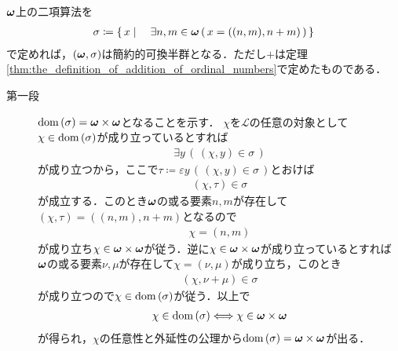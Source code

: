 	\begin{screen}
		\begin{thm}
			${\boldsymbol \omega}$上の二項算法を
			\begin{align}
				\sigma \coloneqq \left\{\, x \mid \quad \exists n,m \in {\boldsymbol \omega}\, (\, x=((n,m),n+m)\, )\, \right\}
			\end{align}
			で定めれば，$({\boldsymbol \omega},\sigma)$は簡約的可換半群となる．ただし$+$は定理
			\ref{thm:the_definition_of_addition_of_ordinal_numbers}で定めたものである．
		\end{thm}
	\end{screen}
	
	\begin{prf}\mbox{}
		\begin{description}
			\item[第一段]
				$\operatorname*{dom} \left(\sigma\right) = {\boldsymbol \omega} \times {\boldsymbol \omega}$となることを示す．
				$\chi$を$\mathcal{L}$の任意の対象として$\chi \in \operatorname*{dom} \left(\sigma\right)$が成り立っているとすれば
				\begin{align}
					\exists y\, (\, (\chi,y) \in \sigma\, )
				\end{align}
				が成り立つから，ここで$\tau \coloneqq \varepsilon y\, (\, (\chi,y) \in \sigma\, )$とおけば
				\begin{align}
					(\chi,\tau) \in \sigma
				\end{align}
				が成立する．このとき${\boldsymbol \omega}$の或る要素$n,m$が存在して$(\chi,\tau) = ((n,m),n+m)$となるので
				\begin{align}
					\chi = (n,m)
				\end{align}
				が成り立ち$\chi \in {\boldsymbol \omega} \times {\boldsymbol \omega}$が従う．逆に$\chi \in {\boldsymbol \omega} \times {\boldsymbol \omega}$が成り立っているとすれば
				${\boldsymbol \omega}$の或る要素$\nu,\mu$が存在して$\chi = (\nu,\mu)$が成り立ち，このとき
				\begin{align}
					(\chi,\nu + \mu) \in \sigma
				\end{align}
				が成り立つので$\chi \in \operatorname*{dom} \left(\sigma\right)$が従う．以上で
				\begin{align}
					\chi \in \operatorname*{dom} \left(\sigma\right) \Longleftrightarrow \chi \in {\boldsymbol \omega} \times {\boldsymbol \omega}
				\end{align}
				が得られ，$\chi$の任意性と外延性の公理から$\operatorname*{dom} \left(\sigma\right) = {\boldsymbol \omega} \times {\boldsymbol \omega}$が出る．
				

\end{description}
\end{prf}

